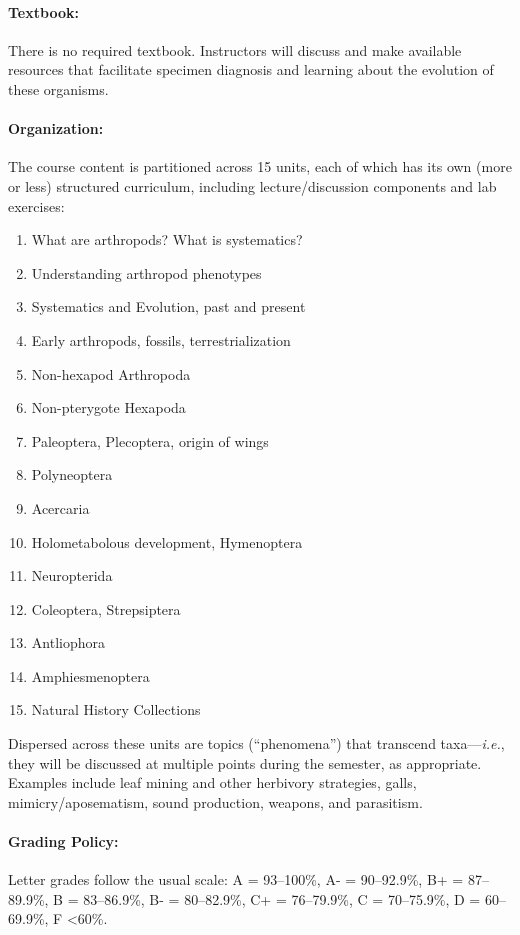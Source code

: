 \documentclass[11pt]{article}
\begin{document}
\paragraph{Textbook:} 
There is no required textbook. Instructors will discuss and make available resources that facilitate specimen diagnosis and learning about the evolution of these organisms.

\paragraph{Organization:}
The course content is partitioned across 15 units, each of which has its own (more or less) structured curriculum, including lecture/discussion components and lab exercises:

\begin{enumerate}
\item What are arthropods? What is systematics?
\item Understanding arthropod phenotypes
\item Systematics and Evolution, past and present
\item Early arthropods, fossils, terrestrialization 
\item Non-hexapod Arthropoda
\item Non-pterygote Hexapoda
\item Paleoptera, Plecoptera, origin of wings
\item Polyneoptera
\item Acercaria
\item Holometabolous development, Hymenoptera
\item Neuropterida
\item Coleoptera, Strepsiptera
\item Antliophora
\item Amphiesmenoptera
\item Natural History Collections
\end{enumerate}

\noindent{}Dispersed across these units are topics (``phenomena'') that transcend taxa---\textit{i.e.}, they will be discussed at multiple points during the semester, as appropriate. Examples include leaf mining and other herbivory strategies, galls, mimicry/aposematism, sound production, weapons, and parasitism.

\paragraph{Grading Policy:} Letter grades follow the usual scale: A = 93--100\%, A- = 90--92.9\%, B+ = 87--89.9\%, B = 83--86.9\%, B- = 80--82.9\%, C+ = 76--79.9\%, C = 70--75.9\%, D = 60--69.9\%, F \textless 60\%.
\end{document}
